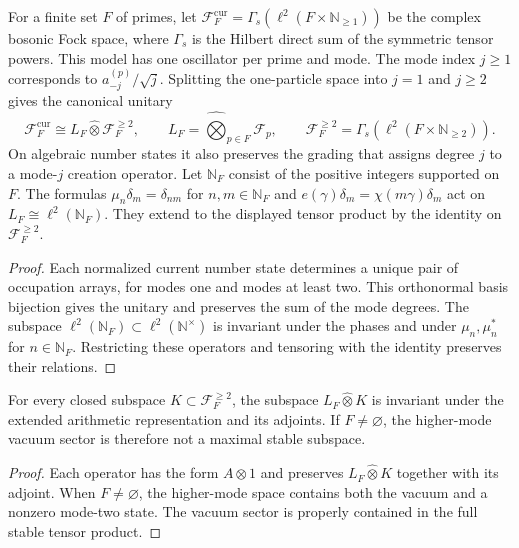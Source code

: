 \begin{proposition}
\label{v4-arith:thm:BC-tensor-placement}

For a finite set $F$ of primes, let
$\mathscr F_F^{\mathrm{cur}}=\Gamma_s(\ell^2(F\times\mathbb N_{\geq1}))$
be the complex bosonic Fock space, where $\Gamma_s$ is the Hilbert
direct sum of the symmetric tensor powers.
This model has one oscillator per prime and mode.
The mode index $j\geq1$ corresponds to $a_{-j}^{(p)}/\sqrt j$.
Splitting the one-particle space into $j=1$ and $j\geq2$ gives
the canonical unitary
\[
 \mathscr F_F^{\mathrm{cur}}
 \cong L_F\widehat\otimes\mathscr F_F^{\geq2},\qquad
 L_F=\widehat\bigotimes_{p\in F}\mathscr F_p,\qquad
 \mathscr F_F^{\geq2}=\Gamma_s(\ell^2(F\times\mathbb N_{\geq2})).
\]
On algebraic number states it also preserves the grading that assigns
degree $j$ to a mode-$j$ creation operator.
Let $\mathbb N_F$ consist of the positive integers supported on $F$.
The formulas $\mu_n\delta_m=\delta_{nm}$ for $n,m\in\mathbb N_F$
and $e(\gamma)\delta_m=\chi(m\gamma)\delta_m$ act on
$L_F\cong\ell^2(\mathbb N_F)$.
They extend to the displayed tensor product by the identity on
$\mathscr F_F^{\geq2}$.
\end{proposition}
\begin{proof}
Each normalized current number state determines a unique pair of
occupation arrays, for modes one and modes at least two.
This orthonormal basis bijection gives the unitary and preserves
the sum of the mode degrees.
The subspace $\ell^2(\mathbb N_F)\subset\ell^2(\mathbb N^\times)$
is invariant under the phases and under $\mu_n,\mu_n^*$ for
$n\in\mathbb N_F$.
Restricting these operators and tensoring with the identity preserves
their relations.
\end{proof}

\begin{corollary}
\label{v4-arith:cor:arithmetic-content-on-lattice}

For every closed subspace $K\subset\mathscr F_F^{\geq2}$,
the subspace $L_F\widehat\otimes K$ is invariant under the extended
arithmetic representation and its adjoints.
If $F\ne\varnothing$, the higher-mode vacuum sector is therefore
not a maximal stable subspace.
\end{corollary}
\begin{proof}
Each operator has the form $A\otimes1$ and preserves
$L_F\widehat\otimes K$ together with its adjoint.
When $F\ne\varnothing$, the higher-mode space contains both the
vacuum and a nonzero mode-two state. The vacuum sector is properly
contained in the full stable tensor product.
\end{proof}

